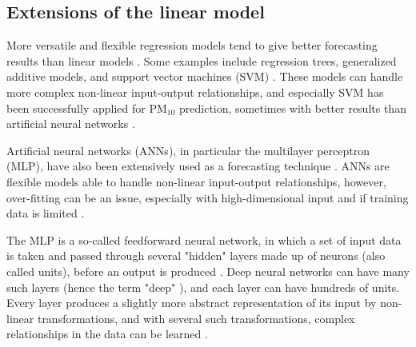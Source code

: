 
\subsection{Extensions of the linear model}
More versatile and flexible regression models tend to give better forecasting results than linear models \cite{atmos7020015}. Some examples include regression trees, generalized additive models, and support vector machines (SVM) \cite{atmos7020015, FaganeliPucer2018}. These models can handle more complex non-linear input-output relationships, and especially SVM has been successfully applied for PM$_{10}$ prediction, sometimes with better results than artificial neural networks \cite{atmos7020015}. 

Artificial neural networks (ANNs), in particular the multilayer perceptron (MLP), have also been extensively used as a forecasting technique \cite{atmos7020015}. ANNs are flexible models able to handle non-linear input-output relationships, however, over-fitting can be an issue, especially with high-dimensional input and if training data is limited \cite{atmos7020015, FaganeliPucer2018}. 

The MLP is a so-called feedforward neural network, in which a set of input data is taken and passed through several "hidden" layers made up of neurons (also called units), before an output is produced \cite{LeCun2015}.
Deep neural networks can have many such layers (hence the term "deep" \cite{Chollet2017}), and each layer can have hundreds of units. Every layer produces a slightly more abstract representation of its input by non-linear transformations, and with several such transformations, complex relationships in the data can be learned \cite{LeCun2015}.

